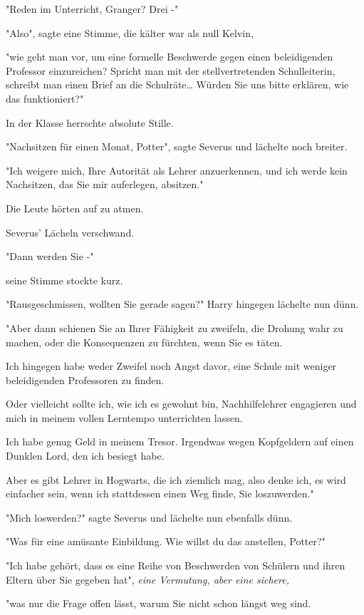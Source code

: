 {"Reden im Unterricht, Granger? Drei -"

"Also", sagte eine Stimme, die kälter war als null Kelvin,

"wie geht man vor, um eine formelle Beschwerde gegen einen beleidigenden Professor einzureichen? Spricht man mit der stellvertretenden Schulleiterin, schreibt man einen Brief an die Schulräte… Würden Sie uns bitte erklären, wie das funktioniert?"

In der Klasse herrschte absolute Stille.

"Nachsitzen für einen Monat, Potter", sagte Severus und lächelte noch breiter.

"Ich weigere mich, Ihre Autorität als Lehrer anzuerkennen, und ich werde kein Nachsitzen, das Sie mir auferlegen, absitzen."

Die Leute hörten auf zu atmen.

Severus' Lächeln verschwand.

"Dann werden Sie -"

seine Stimme stockte kurz.

"Rausgeschmissen, wollten Sie gerade sagen?" Harry hingegen lächelte nun dünn.

"Aber dann schienen Sie an Ihrer Fähigkeit zu zweifeln, die Drohung wahr zu machen, oder die Konsequenzen zu fürchten, wenn Sie es täten.

Ich hingegen habe weder Zweifel noch Angst davor, eine Schule mit weniger beleidigenden Professoren zu finden.

Oder vielleicht sollte ich, wie ich es gewohnt bin, Nachhilfelehrer engagieren und mich in meinem vollen Lerntempo unterrichten lassen.

Ich habe genug Geld in meinem Tresor. Irgendwas wegen Kopfgeldern auf einen Dunklen Lord, den ich besiegt habe.

Aber es gibt Lehrer in Hogwarts, die ich ziemlich mag, also denke ich, es wird einfacher sein, wenn ich stattdessen einen Weg finde, Sie loszuwerden."

"Mich loswerden?" sagte Severus und lächelte nun ebenfalls dünn.

"Was für eine amüsante Einbildung. Wie willst du das anstellen, Potter?"

"Ich habe gehört, dass es eine Reihe von Beschwerden von Schülern und ihren Eltern über Sie gegeben hat", \emph{eine Vermutung, aber eine sichere,}

"was nur die Frage offen lässt, warum Sie nicht schon längst weg sind.

}
